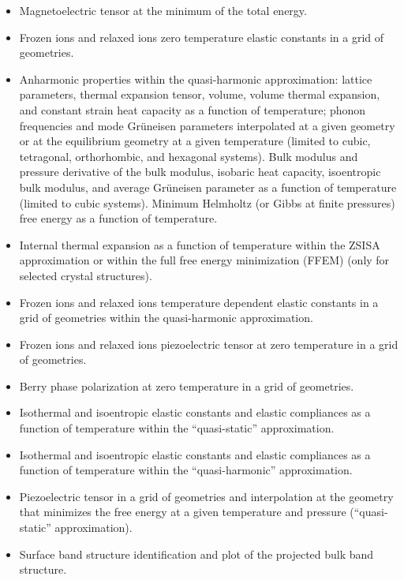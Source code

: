 \documentclass[12pt,a4paper,twoside]{report}
\begin{document}
\begin{itemize}
\item Magnetoelectric tensor at the minimum of the total energy.

\item Frozen ions and relaxed ions zero temperature elastic constants
in a grid of geometries.

\item Anharmonic properties within the quasi-harmonic approximation: 
lattice parameters, thermal expansion tensor, volume, volume thermal 
expansion, and constant strain heat capacity as a function of temperature; 
phonon frequencies and mode Gr\"uneisen parameters interpolated at a given
geometry or at the equilibrium geometry at a given temperature
(limited to cubic, tetragonal, orthorhombic, and hexagonal systems).
Bulk modulus and pressure derivative of the bulk modulus, isobaric heat 
capacity, isoentropic bulk modulus, and average Gr\"uneisen parameter as 
a function of temperature (limited to cubic systems).
Minimum Helmholtz (or Gibbs at finite pressures) free energy 
as a function of temperature.

\item Internal thermal expansion as a function of temperature within
the ZSISA approximation or within the full free energy minimization (FFEM)
(only for selected crystal structures).

\item Frozen ions and relaxed ions temperature dependent elastic constants
in a grid of geometries within the quasi-harmonic approximation.

\item Frozen ions and relaxed ions piezoelectric tensor at zero temperature
in a grid of geometries.

\item Berry phase polarization at zero temperature in a grid of geometries.

\item Isothermal and isoentropic elastic constants and 
elastic compliances as a function of temperature within the ``quasi-static'' 
approximation.

\item Isothermal and isoentropic elastic constants and 
elastic compliances as a function of temperature within the 
``quasi-harmonic'' approximation.

\item Piezoelectric tensor in a grid of geometries and interpolation at the 
geometry that minimizes the free energy at a given temperature and pressure
(``quasi-static'' approximation).

\item Surface band structure identification and plot of the projected bulk
band structure.

\end{itemize}
\end{document}
